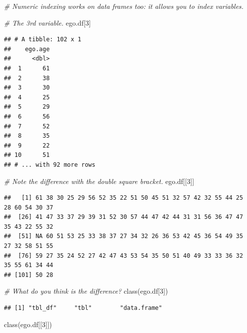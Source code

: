 \documentclass[
]{book}
\newenvironment{Shaded}{\begin{snugshade}}{\end{snugshade}}
\newcommand{\CommentTok}[1]{\textcolor[rgb]{0.56,0.35,0.01}{\textit{#1}}}
\newcommand{\DecValTok}[1]{\textcolor[rgb]{0.00,0.00,0.81}{#1}}
\newcommand{\FunctionTok}[1]{\textcolor[rgb]{0.00,0.00,0.00}{#1}}
\newcommand{\NormalTok}[1]{#1}
\begin{document}
\begin{Shaded}
\begin{Highlighting}[]
\CommentTok{\# Numeric indexing works on data frames too: it allows you to index variables.}

\CommentTok{\# The 3rd variable.}
\NormalTok{ego.df[}\DecValTok{3}\NormalTok{]}
\end{Highlighting}
\end{Shaded}

\begin{verbatim}
## # A tibble: 102 x 1
##    ego.age
##      <dbl>
##  1      61
##  2      38
##  3      30
##  4      25
##  5      29
##  6      56
##  7      52
##  8      35
##  9      22
## 10      51
## # ... with 92 more rows
\end{verbatim}

\begin{Shaded}
\begin{Highlighting}[]
\CommentTok{\# Note the difference with the double square bracket.}
\NormalTok{ego.df[[}\DecValTok{3}\NormalTok{]]}
\end{Highlighting}
\end{Shaded}

\begin{verbatim}
##   [1] 61 38 30 25 29 56 52 35 22 51 50 45 51 32 57 42 32 55 44 25 28 60 54 30 37
##  [26] 41 47 33 37 29 39 31 52 30 57 44 47 42 44 31 31 56 36 47 47 35 43 22 55 32
##  [51] NA 60 51 53 25 33 38 37 27 34 32 26 36 53 42 45 36 54 49 35 27 32 58 51 55
##  [76] 59 27 35 24 52 27 42 47 43 53 54 35 50 51 40 49 33 33 36 32 35 55 61 34 44
## [101] 50 28
\end{verbatim}

\begin{Shaded}
\begin{Highlighting}[]
\CommentTok{\# What do you think is the difference?}
\FunctionTok{class}\NormalTok{(ego.df[}\DecValTok{3}\NormalTok{])}
\end{Highlighting}
\end{Shaded}

\begin{verbatim}
## [1] "tbl_df"     "tbl"        "data.frame"
\end{verbatim}

\begin{Shaded}
\begin{Highlighting}[]
\FunctionTok{class}\NormalTok{(ego.df[[}\DecValTok{3}\NormalTok{]])}
\end{Highlighting}
\end{Shaded}
\end{document}
